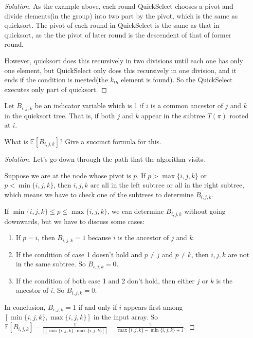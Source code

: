 \begin{proof}[Solution]
    As the example above, each round QuickSelect chooses a pivot and divide elements(in the group) into two part by the pivot, which is the same as quicksort. 
    The pivot of each round in QuickSelect is the same as that in quicksort, as the the pivot of later round is the descendent of that of former round. 

    However, quicksort does this recursively in two divisions until each one has only one element, but QuickSelect only does this recursively in one division, and it ends if the condition is meeted(the $k_{th}$ element is found). 
    So the QuickSelect executes only part of quicksort. 
\end{proof}
\newpage
\begin{thm}{}{}
    Let $B_{i,j,k}$ be an indicator variable which is 1 if $i$ is a common ancestor of  $j$ and $k$ in the quicksort tree. That is, if both $j$ and $k$ appear in the subtree $T(\pi)$ rooted at $i$.
    
    What is $\mathbb{E}[B_{i,j,k}]$? Give a succinct formula for this.
\end{thm}

\begin{proof}[Solution]
    Let's go down through the path that the algorithm visits.
    
    Suppose we are at the node whose pivot is $p$. If $p > \max\{i,j,k\}$ or $p < \min\{i,j,k\}$, then $i,j,k$ are all in the left subtree or all in the right subtree, which means we have to check one of the subtrees to determine $B_{i,j,k}$.
      
    If $\min\{i,j,k\} \leqslant p \leqslant \max\{i,j,k\}$, we can determine $B_{i,j,k}$ without going downwards, but we have to discuss some cases:
    \begin{enumerate}
        \item If $p=i$, then $B_{i,j,k}=1$ because $i$ is the ancestor of $j$ and $k$.
        \item If the condition of case 1 doesn't hold and $p\ne j$ and $p\ne k$, then $i,j,k$ are not in the same subtree. So $B_{i,j,k}=0$.
        \item If the condition of both case 1 and 2 don't hold, then either $j$ or $k$ is the ancestor of $i$. So $B_{i,j,k}=0$.
    \end{enumerate}
    
    In conclusion,  $B_{i,j,k}=1$ if and only if $i$ appears first among $[\min\{i,j,k\},\max\{i,j,k\}]$ in the input array. So  $\mathbb{E}[B_{i,j,k}]=\frac{1}{|[\min\{i,j,k\},\max\{i,j,k\}]|}=\frac{1}{\max\{i,j,k\}-\min\{i,j,k\}+1}$.
\end{proof}

